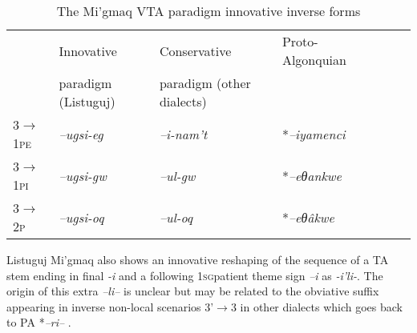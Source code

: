\documentclass[twoside,a4paper,11pt]{article}
\newcommand{\ipa}[1]{{\phon\textit{#1}}}
\newcommand{\sg}{\textsc{sg}}
\newcommand{\grise}[1]{\cellcolor{lightgray}\textbf{#1}}
\newcommand{\Σ}{\greek{Σ}}
\begin{document}
\begin{table}[H]
\caption{The Mi'gmaq VTA paradigm innovative inverse forms}
\centering \label{tab:migmaq.vta.innov}
\begin{tabular}{lllllll}
\toprule
& Innovative & Conservative & Proto-Algonquian \\
&paradigm (Listuguj) & paradigm (other dialects) &\\
\midrule
\textsc{3$\rightarrow$1pe} & 	\ipa{--ugsi-eg} \grise{}& 	\ipa{--i-nam't} &  *\ipa{--iyamenci} & 		\\
\textsc{3$\rightarrow$1pi} & 	\ipa{--ugsi-gw} \grise{}& 	\ipa{--ul-gw}  &*\ipa{--eθankwe} & 		\\
\midrule
\textsc{3$\rightarrow$2p} & \ipa{--ugsi-oq} \grise{}& 	\ipa{--ul-oq} & *\ipa{--eθâkwe} & 		\\
\bottomrule
\end{tabular}
\end{table}

Listuguj Mi'gmaq also shows an innovative reshaping of the sequence of a TA stem ending in final \ipa{-i} and a following 1\sg patient theme sign \ipa{--i} as \ipa{-i'li-}. The origin of this extra \ipa{--li--} is unclear  but may be related to the obviative suffix appearing in inverse non-local scenarios 3'$\rightarrow$3 in other dialects which goes back to PA *\ipa{--ri--} .
\end{document}
